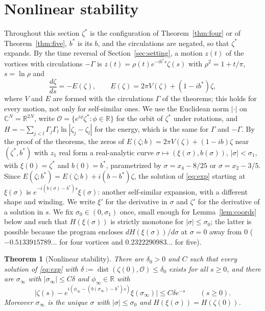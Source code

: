 \documentclass[11pt]{article}
\newtheorem{theorem}{Theorem}
\theoremstyle{definition}
\newcommand{\C}{\mathbb{C}}
\newcommand{\R}{\mathbb{R}}
\begin{document}
\section{Nonlinear stability}\label{sec:nonlinear}

Throughout this section $\zeta^*$ is the configuration of Theorem~\ref{thm:four} or of Theorem~\ref{thm:five}, $b^*$ is its $b$, and the circulations are negated, so that $\zeta^*$ expands. By the time reversal of Section~\ref{sec:setting}, a motion $z(t)$ of the vortices with circulations $-\Gamma$ is $z(t) = \rho(t)e^{-ib^*s}\zeta(s)$ with $\rho^2 = 1 + t/\pi$, $s = \ln\rho$ and
\begin{equation}\label{eq:exp}
  \frac{d\zeta}{ds} = -E(\zeta),\qquad E(\zeta) = 2\pi V(\zeta) + (1 - ib^*)\zeta,
\end{equation}
where $V$ and $E$ are formed with the circulations $\Gamma$ of the theorems; this holds for every motion, not only for self-similar ones. We use the Euclidean norm $|\cdot|$ on $\C^N = \R^{2N}$, write $\mathcal O = \{e^{i\phi}\zeta^*: \phi \in \R\}$ for the orbit of $\zeta^*$ under rotations, and $H = -\sum_{j<l}\Gamma_j\Gamma_l\ln|\zeta_j - \zeta_l|$ for the energy, which is the same for $\Gamma$ and $-\Gamma$. By the proof of the theorems, the zeros of $E(\zeta; b) = 2\pi V(\zeta) + (1 - ib)\zeta$ near $(\zeta^*, b^*)$ with $z_1$ real form a real-analytic curve $\sigma \mapsto (\xi(\sigma), b(\sigma))$, $|\sigma| < \sigma_1$, with $\xi(0) = \zeta^*$ and $b(0) = b^*$, parametrized by $\sigma = x_4 - 8/25$ or $\sigma = x_2 - 3/5$. Since $E(\zeta; b^*) = E(\zeta; b) + i(b - b^*)\zeta$, the solution of \eqref{eq:exp} starting at $\xi(\sigma)$ is $e^{-i(b(\sigma) - b^*)s}\xi(\sigma)$: another self-similar expansion, with a different shape and winding. We write $\xi'$ for the derivative in $\sigma$ and $\zeta'$ for the derivative of a solution in $s$. We fix $\sigma_0 \in (0, \sigma_1)$ once, small enough for Lemma~\ref{lem:coords} below and such that $H(\xi(\sigma))$ is strictly monotone for $|\sigma| \le \sigma_0$; the latter is possible because the program encloses $dH(\xi(\sigma))/d\sigma$ at $\sigma = 0$ away from $0$ ($-0.5133915789\ldots$ for four vortices and $0.2322290983\ldots$ for five).

\begin{theorem}[Nonlinear stability]\label{thm:nonlinear}
There are $\delta_0 > 0$ and $C$ such that every solution of \eqref{eq:exp} with $\delta := \operatorname{dist}(\zeta(0), \mathcal O) \le \delta_0$ exists for all $s \ge 0$, and there are $\sigma_\infty$ with $|\sigma_\infty| \le C\delta$ and $\phi_\infty \in \R$ with
\[
  \bigl|\zeta(s) - e^{i(\phi_\infty - (b(\sigma_\infty) - b^*)s)}\xi(\sigma_\infty)\bigr| \le C\delta e^{-s}\qquad (s \ge 0).
\]
Moreover $\sigma_\infty$ is the unique $\sigma$ with $|\sigma| \le \sigma_0$ and $H(\xi(\sigma)) = H(\zeta(0))$.
\end{theorem}
\end{document}
